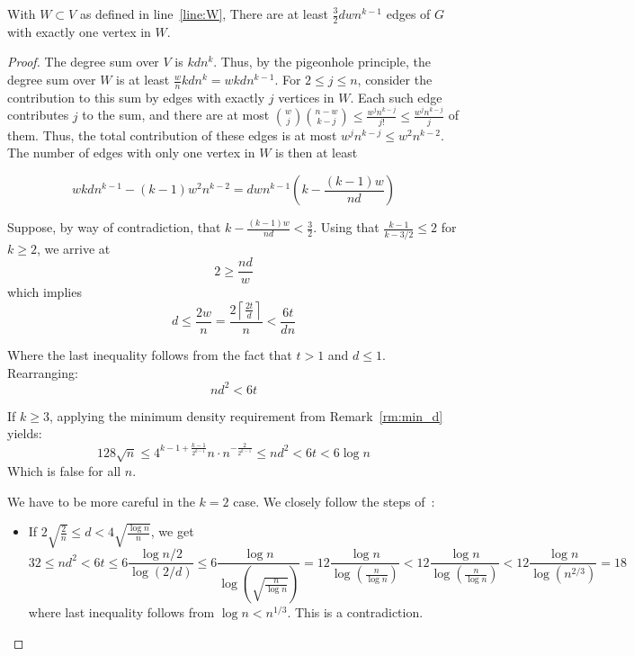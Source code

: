 \begin{lemma}\label{lm:many_edges}
    With $W  \subset V$ as defined in line~\ref{line:W},
    There are at least $\frac{3}{2}dwn^{k-1}$ edges of $G$ with exactly one vertex in $W$.
    \begin{proof}
        The degree sum over $V$ is $kdn^{k}$.
        Thus, by the pigeonhole principle, the degree sum over $W$ is at least
        $\frac{w}{n}kdn^{k} = wkdn^{k-1}$.
        For $2 \leq j \leq n$,
        consider the contribution to this sum by edges with exactly $j$ vertices in $W$.
        Each such edge contributes $j$ to the sum, and there are at most
        $\binom{w}{j}\binom{n-w}{k-j} \leq
        \frac{w^j n^{k-j}}{j!} \leq
        \frac{w^j n^{k-j}}{j}$ of them.
        Thus, the total contribution of these edges is at most $w^j n^{k-j} \leq w^{2}n^{k-2}$.
        The number of edges with only one vertex in $W$ is then at least

        \[
            wkdn^{k-1} - (k-1)w^{2}n^{k-2} = dwn^{k-1} \left( k - \frac{(k-1)w}{nd}\right)
        \]

        Suppose, by way of contradiction,
        that $ k - \frac{(k-1)w}{nd} < \frac{3}{2}$.
        Using that $\frac{k-1}{k-3/2} \leq 2$
        for $k \geq 2$, we arrive at
        \[
             2 \geq  \frac{nd}{w}
        \]
        which implies
        \[
            d \leq \frac{2w}{n} = \frac{2 \left\lceil\frac{2t}{d} \right\rceil}{n}
            < \frac{6t}{dn}
        \]

        Where the last inequality follows from the fact that $t > 1$ and $d \leq 1$.
        Rearranging:
        \[
            nd^2 < 6t
        \]

        If $k \geq 3$, applying the minimum density requirement from Remark~\ref{rm:min_d} yields:
        \[
            128 \sqrt {n} \leq 4^{k-1 + \frac{k-1}{2^{k-1}}} n \cdot n^{-\frac{2}{2^{k-1}}} \leq nd^2 < 6t < 6 \log n
        \]
        Which is false for all $n$.

        We have to be more careful in the $k = 2$ case.
        We closely follow the steps of~\cite{MUBAYI2010174}:
        \begin{itemize}
            \item If $2 \sqrt{\frac{2}{n}} \leq d < 4 \sqrt{\frac{\log n}{n}}$, we get
            \[
                32 \leq nd^2
                < 6t \leq
                6 \frac{\log n/2}{\log(2/d) } \leq
                6 \frac{\log n}{\log\left(\sqrt{\frac{n}{\log n}}\right)} =
                12 \frac{\log n}{{\log \left( \frac{n}{\log n} \right)}} <
                12 \frac{\log n}{{\log \left( \frac{n}{\log n} \right)}} <
                12 \frac{\log n}{{\log \left( n^{2/3} \right)}} =
                18
            \]
            where last inequality follows from $\log n < n^{1/3}$.
            This is a contradiction.


\end{itemize}
\end{proof}
\end{lemma}
